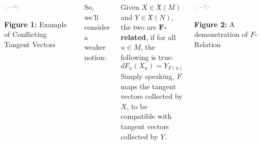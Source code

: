 \documentclass[20pt,margin=0.9in,innermargin=-4.5in,blockverticalspace=-0.25in]{tikzposter}
\begin{document}
\begin{columns}
{        \begin{center}
            \includegraphics[width=0.24\textwidth]{example 1.png} 

            \textbf{Figure 1:} Example of Conflicting Tangent Vectors
        \end{center}

        \hfil

        So, we'll consider a weaker notion: 
        \begin{definitionBox}
            Given $X\in\mathfrak{X}(M)$ and $Y\in\mathfrak{X}(N)$, the two are $\boldsymbol{F}$\textbf{-related}, if for all $u\in M$, the following is true:
            $$dF_u(X_u) = Y_{F(u)}$$
            Simply speaking, $F$ maps the tangent vectors collected by $X$, to be compatible with tangent vectors collected by $Y$.
        \end{definitionBox}

        \begin{center}
            \includegraphics[width=0.24\textwidth]{example 2.png} 

            \textbf{Figure 2:} A demonstration of $F$-Relation
        \end{center}
    }



\end{columns}
\end{document}
